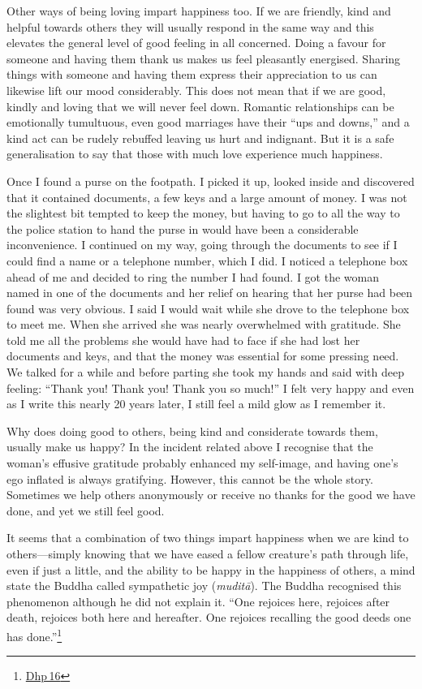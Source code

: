 \documentclass[10pt, openright]{book}
\begin{document}
Other ways of being loving impart happiness too. If we are friendly, kind and helpful towards others they will usually respond in the same way and this elevates the general level of good feeling in all concerned. Doing a favour for someone and having them thank us makes us feel pleasantly energised. Sharing things with someone and having them express their appreciation to us can likewise lift our mood considerably. This does not mean that if we are good, kindly and loving that we will never feel down. Romantic relationships can be emotionally tumultuous, even good marriages have their “ups and downs,” and a kind act can be rudely rebuffed leaving us hurt and indignant. But it is a safe generalisation to say that those with much love experience much happiness.


Once I found a purse on the footpath. I picked it up, looked inside and discovered that it contained documents, a few keys and a large amount of money. I was not the slightest bit tempted to keep the money, but having to go to all the way to the police station to hand the purse in would have been a considerable inconvenience. I continued on my way, going through the documents to see if I could find a name or a telephone number, which I did. I noticed a telephone box ahead of me and decided to ring the number I had found. I got the woman named in one of the documents and her relief on hearing that her purse had been found was very obvious. I said I would wait while she drove to the telephone box to meet me. When she arrived she was nearly overwhelmed with gratitude. She told me all the problems she would have had to face if she had lost her documents and keys, and that the money was essential for some pressing need. We talked for a while and before parting she took my hands and said with deep feeling: “Thank you! Thank you! Thank you so much!” I felt very happy and even as I write this nearly 20 years later, I still feel a mild glow as I remember it.


Why does doing good to others, being kind and considerate towards them, usually make us happy? In the incident related above I recognise that the woman’s effusive gratitude probably enhanced my self-image, and having one’s ego inflated is always gratifying. However, this cannot be the whole story. Sometimes we help others anonymously or receive no thanks for the good we have done, and yet we still feel good.


It seems that a combination of two things impart happiness when we are kind to others—simply knowing that we have eased a fellow creature’s path through life, even if just a little, and the ability to be happy in the happiness of others, a mind state the Buddha called sympathetic joy (\textit{muditā}). The Buddha recognised this phenomenon although he did not explain it. “One rejoices here, rejoices after death, rejoices both here and hereafter. One rejoices recalling the good deeds one has done.”\footnote {\href{https://suttacentral.net/dhp16/en/sujato}{Dhp 16}}
\end{document}
